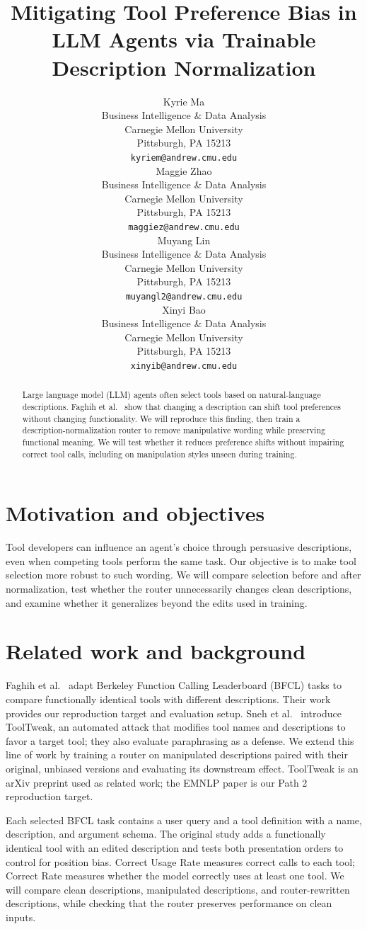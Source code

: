 \documentclass{article}
\title{Mitigating Tool Preference Bias in LLM Agents via Trainable Description Normalization}
\author{%
  Kyrie Ma \\
  Business Intelligence \& Data Analysis \\
  Carnegie Mellon University \\
  Pittsburgh, PA 15213 \\
  \texttt{kyriem@andrew.cmu.edu} \\
  \And
  Maggie Zhao \\
  Business Intelligence \& Data Analysis \\
  Carnegie Mellon University \\
  Pittsburgh, PA 15213 \\
  \texttt{maggiez@andrew.cmu.edu} \\
  \And
  Muyang Lin \\
  Business Intelligence \& Data Analysis \\
  Carnegie Mellon University \\
  Pittsburgh, PA 15213 \\
  \texttt{muyangl2@andrew.cmu.edu} \\
  \And
  Xinyi Bao \\
  Business Intelligence \& Data Analysis \\
  Carnegie Mellon University \\
  Pittsburgh, PA 15213 \\
  \texttt{xinyib@andrew.cmu.edu} \\
}
\begin{document}
\maketitle

\begin{abstract}
Large language model (LLM) agents often select tools based on natural-language descriptions. Faghih et al.~\citep{faghih2025} show that changing a description can shift tool preferences without changing functionality. We will reproduce this finding, then train a description-normalization router to remove manipulative wording while preserving functional meaning. We will test whether it reduces preference shifts without impairing correct tool calls, including on manipulation styles unseen during training.
\end{abstract}

\section{Motivation and objectives}

Tool developers can influence an agent's choice through persuasive descriptions, even when competing tools perform the same task. Our objective is to make tool selection more robust to such wording. We will compare selection before and after normalization, test whether the router unnecessarily changes clean descriptions, and examine whether it generalizes beyond the edits used in training.

\section{Related work and background}

Faghih et al.~\citep{faghih2025} adapt Berkeley Function Calling Leaderboard (BFCL) tasks to compare functionally identical tools with different descriptions. Their work provides our reproduction target and evaluation setup. Sneh et al.~\citep{sneh2025} introduce ToolTweak, an automated attack that modifies tool names and descriptions to favor a target tool; they also evaluate paraphrasing as a defense. We extend this line of work by training a router on manipulated descriptions paired with their original, unbiased versions and evaluating its downstream effect. ToolTweak is an arXiv preprint used as related work; the EMNLP paper is our Path 2 reproduction target.

Each selected BFCL task contains a user query and a tool definition with a name, description, and argument schema. The original study adds a functionally identical tool with an edited description and tests both presentation orders to control for position bias. Correct Usage Rate measures correct calls to each tool; Correct Rate measures whether the model correctly uses at least one tool. We will compare clean descriptions, manipulated descriptions, and router-rewritten descriptions, while checking that the router preserves performance on clean inputs.
\end{document}
